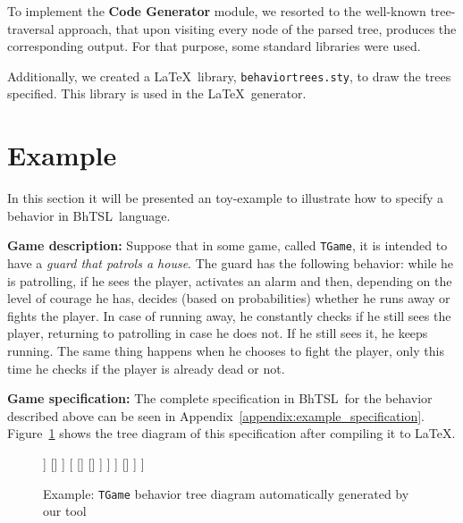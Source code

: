 \documentclass[a4paper,UKenglish,cleveref, autoref, thm-restate]{oasics-v2019}
\def\bht{BhTSL}
\begin{document}
To implement the \textbf{Code Generator} module, we resorted to the well-known tree-traversal approach, that upon visiting every node of the parsed tree, produces the corresponding output.
For that purpose, some standard libraries were used.

Additionally, we created a \LaTeX\ library, \texttt{behaviortrees.sty}, to draw the trees specified. 
This library is used in the \LaTeX\ generator.

\section{Example}
\label{sec:example}
In this section it will be presented an toy-example to illustrate how to specify a behavior in \bht\ language.

\textbf{Game description:} Suppose that in some game, called \texttt{TGame}, 
it is intended  to have a \emph{guard that patrols a house}.
The guard has the following behavior: while he is patrolling, if he sees the player, activates an alarm and then, 
depending on the level of courage he has, decides (based on probabilities) whether he runs away or fights the player.
In case of running away, he constantly checks if he still sees the player, returning to patrolling in case he does not. 
If he still sees it, he keeps running.
The same thing happens when he chooses to fight the player, only this time he checks if the player is already dead 
or not.


\textbf{Game specification:}
The complete specification in \bht\ for the behavior described above can be seen in 
Appendix~\ref{appendix:example_specification}.
Figure~\ref{fig:example} shows the tree diagram of this specification after compiling it to \LaTeX.
\begin{figure}[h]
    \centering
    \begin{behavior}
        [\rootnode
            [\selector
                [\memorysequence
                    [\condition{sees player}]
                    [\action{activate alarm}]
                    [\memoryprobselector
                        [\probnodesequence{$e1$}
                            [\inverter
                                [\condition{player dead}]
                            ]
                            []
                        ]
                        [
                            []
                            []
                        ]
                    ]
                ]
                []
            ]
        ]
    \end{behavior}
    \caption{Example: \texttt{TGame} behavior tree diagram automatically generated by our tool }
    \label{fig:example}
\end{figure}
\end{document}
